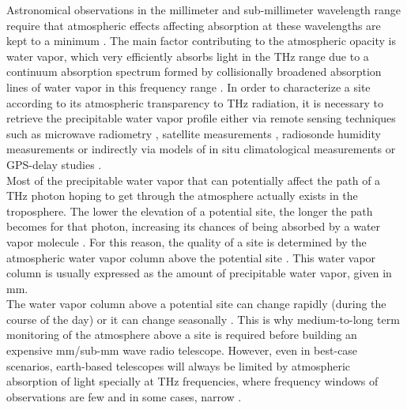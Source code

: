 \documentclass[12pt]{iopart}
\begin{document}
Astronomical observations in the millimeter and sub-millimeter wavelength range require that atmospheric effects affecting absorption at these wavelengths are kept to a minimum \cite{southpole,radford2016,chajpwv}. The main factor contributing to the atmospheric opacity is water vapor, which very efficiently absorbs light in the THz range \cite{pardocerni,pardocerni2,cont350} due to a continuum absorption spectrum formed by collisionally broadened absorption lines of water vapor in this frequency range  \cite{linecont,submmlines,turner2009}. In order to characterize a site according to its atmospheric transparency to THz radiation, it is necessary to retrieve the precipitable water vapor profile either via remote sensing techniques such as microwave radiometry \cite{radiometer,paine2000fourier,southpole2}, satellite measurements \cite{aqua,spacemols,suen2014,spaceradio}, radiosonde humidity measurements \cite{radiosonde,radiosonde2} or indirectly via models of in situ climatological measurements \cite{climatology} or GPS-delay studies \cite{gpsorig,gpsmap}. \\

Most of the precipitable water vapor that can potentially affect the path of a THz photon hoping to get through the atmosphere actually exists in the troposphere. The lower the elevation of a potential site, the longer the path becomes for that photon, increasing its chances of being absorbed by a water vapor molecule \cite{liebe1989mpm,linecont,lababs}. For this reason, the quality of a site is determined by the atmospheric water vapor column above the potential site \cite{mkradio,southpole3,he2012,atacama}. This water vapor column is usually expressed as the amount of precipitable water vapor, given in mm.\\

The water vapor column above a potential site can change rapidly (during the course of the day) or it can change seasonally \cite{arm2013,caumont2016}. This is why medium-to-long term monitoring of the atmosphere above a site is required before building an expensive mm/sub-mm wave radio telescope. However, even in best-case scenarios, earth-based telescopes will always be limited by atmospheric absorption of light specially at THz frequencies, where frequency windows of observations are few and in some cases, narrow \cite{arrlim,limits}. \\
\end{document}
